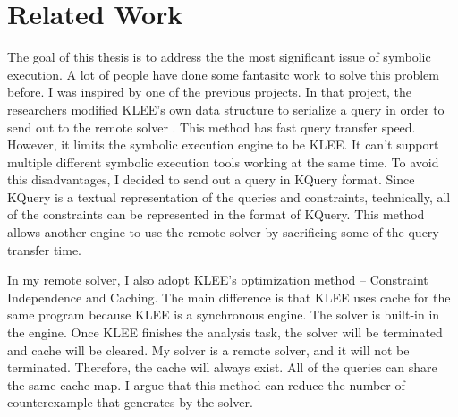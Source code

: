 \section{Related Work}

The goal of this thesis is to address the the most significant issue of symbolic execution. A lot of people have done some fantasitc work to solve this problem before. I was inspired by one of the previous projects. In that project, the researchers modified KLEE's own data structure to serialize a query in order to send out to the remote solver \cite{Rakadjiev:2015:PSS:2847598.2847727}. This method has fast query transfer speed. However, it limits the symbolic execution engine to be KLEE. It can't support multiple different symbolic execution tools working at the same time. To avoid this disadvantages, I decided to send out a query in KQuery format. Since KQuery is a textual representation of the queries and constraints, technically, all of the constraints can be represented in the format of KQuery. This method allows another engine to use the remote solver by sacrificing some of the query transfer time.

In my remote solver, I also adopt KLEE's optimization method -- Constraint Independence and Caching. The main difference is that KLEE uses cache for the same program because KLEE is a synchronous engine. The solver is built-in in the engine. Once KLEE finishes the analysis task, the solver will be terminated and cache will be cleared. My solver is a remote solver, and it will not be terminated. Therefore, the cache will always exist. All of the queries can share the same cache map. I argue that this method can reduce the number of counterexample that generates by the solver. 